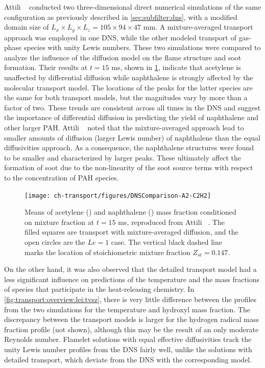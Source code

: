 Attili \etal~\cite{attili2016} conducted two three-dimensional direct numerical simulations of the same configuration as previously described in \cref{sec:subfilter:dns}, with a modified domain size of $L_x \times L_y \times L_z = 105 \times 94 \times 47$ mm. A mixture-averaged transport approach was employed in one DNS, while the other modeled transport of gas-phase species with unity Lewis numbers. These two simulations were compared to analyze the influence of the diffusion model on the flame structure and soot formation. Their results at $t = 15$ ms, shown in \cref{fig:transport:overview:lei:a2vsz}, indicate that acetylene is unaffected by differential diffusion while naphthalene is strongly affected by the molecular transport model. The locations of the peaks for the latter species are the same for both transport models, but the magnitudes vary by more than a factor of two. These trends are consistent across all times in the DNS and suggest the importance of differential diffusion in predicting the yield of naphthalene and other larger PAH. Attili \etal~\cite{attili2016} noted that the mixture-averaged approach lead to smaller amounts of diffusion (larger Lewis number) of naphthalene than the equal diffusivities approach. As a consequence, the naphthalene structures were found to be smaller and characterized by larger peaks. These ultimately affect the formation of soot due to the non-linearity of the soot source terms with respect to the concentration of PAH species.

\begin{figure}[htb]
  \centering
  \texttt{[image: ch-transport/figures/DNSComparison-A2-C2H2]}
  \caption[DNS Results with \texorpdfstring{$Le = 1$}{Le = 1} and \texorpdfstring{$Le \neq 1$}{Le != 1}, \texorpdfstring{$\langle Y_{\ce{C2H2}}|Z \rangle$}{<YC2H2|Z>} \& \texorpdfstring{$\langle Y_{\text{A2}}|Z \rangle$}{<YA2|Z>} vs. \texorpdfstring{$Z$}{Z}]{Means of acetylene () and naphthalene () mass fraction conditioned on mixture fraction at $t = 15$ ms, reproduced from Attili \etal~\cite{attili2016}. The filled squares are transport with mixture-averaged diffusion, and the open circles are the $Le = 1$ case. The vertical black dashed line marks the location of stoichiometric mixture fraction $Z_{st} = 0.147$.}
  \label{fig:transport:overview:lei:a2vsz}
\end{figure}

On the other hand, it was also observed that the detailed transport model had a less significant influence on predictions of the temperature and the mass fractions of species that participate in the heat-releasing chemistry. In \cref{fig:transport:overview:lei:tvsz}, there is very little difference between the profiles from the two simulations for the temperature and hydroxyl mass fraction. The discrepancy between the transport models is larger for the hydrogen radical mass fraction profile (not shown), although this may be the result of an only moderate Reynolds number. Flamelet solutions with equal effective diffusivities track the unity Lewis number profiles from the DNS fairly well, unlike the solutions with detailed transport, which deviate from the DNS with the corresponding model.


